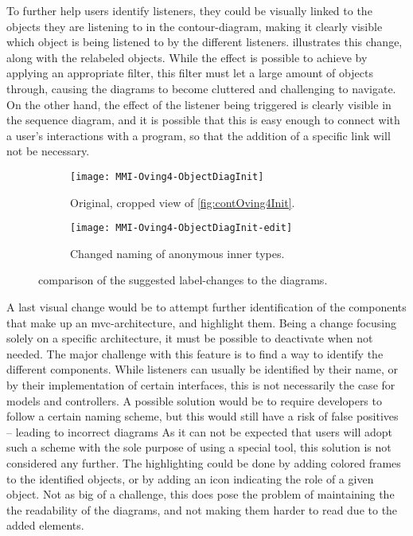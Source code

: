 To further help users identify listeners, they could be visually linked to the objects they are listening to in the contour-diagram, making it clearly visible which object is being listened to by the different listeners.
 illustrates this change, along with the relabeled objects.
While the effect is possible to achieve by applying an appropriate filter, this filter must let a large amount of objects through, causing the diagrams to become cluttered and challenging to navigate.
On the other hand, the effect of the listener being triggered is clearly visible in the sequence diagram, and it is possible that this is easy enough to connect with a user's interactions with a program, so that the addition of a specific link will not be necessary.
\begin{figure}[H]
	\centering
	\begin{subfigure}{\textwidth}
		\centering
		\texttt{[image: MMI-Oving4-ObjectDiagInit]}
		\caption{Original, cropped view of \cref{fig:contOving4Init}.}
		\label{fig:contOving4ChangesLabA}
	\end{subfigure}
	\begin{subfigure}{\textwidth}
		\centering
		\texttt{[image: MMI-Oving4-ObjectDiagInit-edit]}
		\caption{Changed naming of anonymous inner types.}
		\label{fig:contOving4ChangesLabB}
	\end{subfigure}
	\caption{comparison of the suggested label-changes to the diagrams.}
	\label{fig:contOving4ChangesLab}
\end{figure}
A last visual change would be to attempt further identification of the components that make up an \gls{mvc}-architecture, and highlight them.
Being a change focusing solely on a specific architecture, it must be possible to deactivate when not needed.
The major challenge with this feature is to find a way to identify the different components.
While listeners can usually be identified by their name, or by their implementation of certain interfaces, this is not necessarily the case for models and controllers.
A possible solution would be to require developers to follow a certain naming scheme, but this would still have a risk of false positives -- leading to incorrect diagrams
As it can not be expected that users will adopt such a scheme with the sole purpose of using a special tool, this solution is not considered any further.
The highlighting could be done by adding colored frames to the identified objects, or by adding an icon indicating the role of a given object.
Not as big of a challenge, this does pose the problem of maintaining the the readability of the diagrams, and not making them harder to read due to the added elements.



